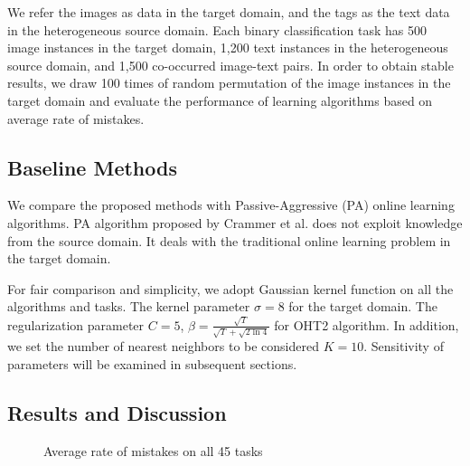 \documentclass[letterpaper]{article}
\begin{document}
We refer the images as data in the target domain, and the tags as the text data in the heterogeneous source domain.
Each binary classification task has 500 image instances in the target domain, 1,200 text instances in the heterogeneous source domain, and 1,500 co-occurred image-text pairs.
In order to obtain stable results, we draw 100 times of random permutation of the image instances in the target domain and evaluate the performance of learning algorithms based on average rate of mistakes.

\subsection{Baseline Methods}
We compare the proposed methods with Passive-Aggressive (PA) online learning algorithms.
PA algorithm proposed by Crammer et al. does not exploit knowledge from the source domain.
It deals with the traditional online learning problem in the target domain.

For fair comparison and simplicity, we adopt Gaussian kernel function on all the algorithms and tasks.
The kernel parameter $\sigma = 8$ for the target domain.
The regularization parameter $C = 5$, $ \beta = \frac{\sqrt{T}}{\sqrt{T}+\sqrt{2\ln{4}}} $ for OHT2 algorithm.
In addition, we set the number of nearest neighbors to be considered $K = 10$.
Sensitivity of parameters will be examined in subsequent sections.

\subsection{Results and Discussion}
\begin{figure}[!htb]
\begin{center}
\end{center}
  \caption{Average rate of mistakes on all 45 tasks}
  \label{Average rate of mistakes on all 45 tasks}
\end{figure}
\end{document}

